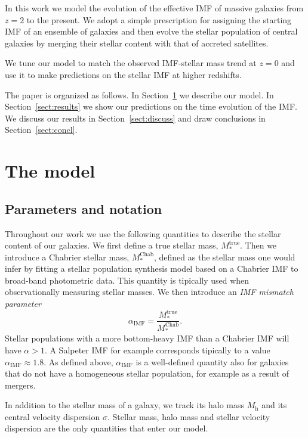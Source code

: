 \documentclass[usenatbib, letters]{mnras}
\def\mhalo{M_{\mathrm{h}}}
\def\mtrue{M_*^{\mathrm{true}}}
\def\mchab{M_*^{\mathrm{Chab}}}
\def\aimf{\alpha_{\mathrm{IMF}}}
\def\Sref#1{Section~\ref{#1}\xspace}
\begin{document}
In this work we model the evolution of the effective IMF of massive galaxies from $z=2$ to the present.
We adopt a simple prescription for assigning the starting IMF of an ensemble of galaxies and then evolve the stellar population of central galaxies by merging their stellar content with that of accreted satellites.

We tune our model to match the observed IMF-stellar mass trend at $z=0$ and use it to make predictions on the stellar IMF at higher redshifts.

The paper is organized as follows.  In \Sref{sect:model} we describe our model.
In \Sref{sect:results} we show our predictions on the time evolution of the IMF.
We discuss our results in \Sref{sect:discuss} and draw conclusions in \Sref{sect:concl}.


\section{The model}\label{sect:model}

\subsection{Parameters and notation}
Throughout our work we use the following quantities to describe the stellar content of our galaxies. We first define a true stellar mass, $\mtrue$. Then we introduce a Chabrier stellar mass, $\mchab$, defined as the stellar mass one would infer by fitting a stellar population synthesis model based on a Chabrier IMF to broad-band photometric data. This quantity is tipically used when observationally measuring stellar masses.
We then introduce an {\em IMF mismatch parameter}
\begin{equation}\label{eq:aimf}
\aimf = \frac{\mtrue}{\mchab}.
\end{equation}
Stellar populations with a more bottom-heavy IMF than a Chabrier IMF will have $\alpha>1$. A Salpeter IMF for example corresponds tipically to a value $\aimf\approx1.8$.
As defined above, $\aimf$ is a well-defined quantity also for galaxies that do not have a homogeneous stellar population, for example as a result of mergers.

In addition to the stellar mass of a galaxy, we track its halo mass $\mhalo$ and its central velocity dispersion $\sigma$.
Stellar mass, halo mass and stellar velocity dispersion are the only quantities that enter our model.
\end{document}
